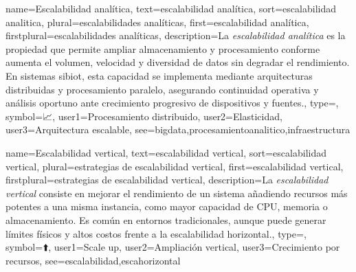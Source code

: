 	{
		name={Escalabilidad anal{\'i}tica},
		text={escalabilidad anal{\'i}tica},
		sort={escalabilidad analitica},
		plural={escalabilidades anal{\'i}ticas},
		first={escalabilidad anal{\'i}tica},
		firstplural={escalabilidades anal{\'i}ticas},
		description={La \emph{escalabilidad anal{\'i}tica} es la propiedad que permite ampliar almacenamiento y procesamiento conforme aumenta el volumen, velocidad y diversidad de datos sin degradar el rendimiento. En sistemas \gls{sibiot}, esta capacidad se implementa mediante arquitecturas distribuidas y procesamiento paralelo, asegurando continuidad operativa y an{\'a}lisis oportuno ante crecimiento progresivo de dispositivos y fuentes.},
		type=\glsdefaulttype,
		symbol={📈},
		user1={Procesamiento distribuido},
		user2={Elasticidad},
		user3={Arquitectura escalable},
		see={bigdata,procesamientoanalitico,infraestructura}
	}
	
	
	{
		name={Escalabilidad vertical},
		text={escalabilidad vertical},
		sort={escalabilidad vertical},
		plural={estrategias de escalabilidad vertical},
		first={escalabilidad vertical},
		firstplural={estrategias de escalabilidad vertical},
		description={La \emph{escalabilidad vertical} consiste en mejorar el rendimiento de un \gls{sistema} a{\~n}adiendo recursos m{\'a}s potentes a una misma instancia, como mayor capacidad de CPU, memoria o almacenamiento. Es com{\'u}n en entornos tradicionales, aunque puede generar l{\'i}mites f{\'i}sicos y altos costos frente a la escalabilidad horizontal.},
		type=\glsdefaulttype,
		symbol={⬆️},
		user1={Scale up},
		user2={Ampliaci{\'o}n vertical},
		user3={Crecimiento por recursos},
		see={escalabilidad,escahorizontal}
	}
	
